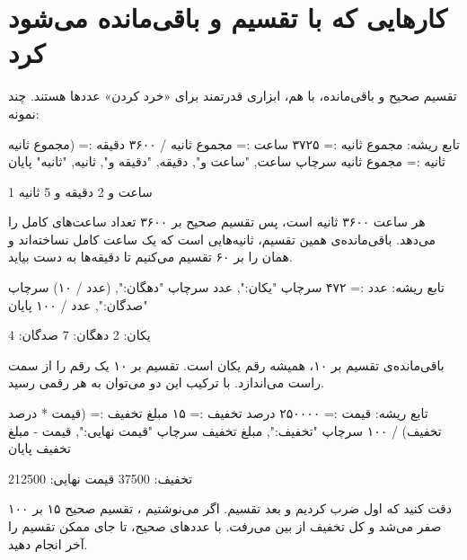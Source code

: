 \section{کارهایی که با تقسیم و باقی‌مانده می‌شود کرد}

تقسیم صحیح و باقی‌مانده، با هم، ابزاری قدرتمند برای «خرد کردن» عددها
هستند. چند نمونه:

\begin{salamfa}
تابع ریشه:
    مجموع ثانیه := ۳۷۲۵
    ساعت := مجموع ثانیه / ۳۶۰۰
    دقیقه := (مجموع ثانیه %
    ثانیه := مجموع ثانیه %
    سرچاپ ساعت, "ساعت و", دقیقه, "دقیقه و", ثانیه, "ثانیه"
پایان
\end{salamfa}

\begin{outputfa}
1 ساعت و 2 دقیقه و 5 ثانیه
\end{outputfa}

هر ساعت ۳۶۰۰ ثانیه است، پس تقسیم صحیح بر ۳۶۰۰ تعداد ساعت‌های کامل را
می‌دهد. باقی‌مانده‌ی همین تقسیم، ثانیه‌هایی است که یک ساعت کامل نساخته‌اند و
همان را بر ۶۰ تقسیم می‌کنیم تا دقیقه‌ها به دست بیاید.

\begin{salamfa}
تابع ریشه:
    عدد := ۴۷۲
    سرچاپ "یکان:", عدد %
    سرچاپ "دهگان:", (عدد / ۱۰) %
    سرچاپ "صدگان:", عدد / ۱۰۰
پایان
\end{salamfa}

\begin{outputfa}
یکان: 2
دهگان: 7
صدگان: 4
\end{outputfa}

باقی‌مانده‌ی تقسیم بر ۱۰، همیشه رقم یکان است. تقسیم بر ۱۰ یک رقم را از
سمت راست می‌اندازد. با ترکیب این دو می‌توان به هر رقمی رسید.

\begin{salamfa}
تابع ریشه:
    قیمت := ۲۵۰۰۰۰
    درصد تخفیف := ۱۵
    مبلغ تخفیف := (قیمت * درصد تخفیف) / ۱۰۰
    سرچاپ "تخفیف:", مبلغ تخفیف
    سرچاپ "قیمت نهایی:", قیمت - مبلغ تخفیف
پایان
\end{salamfa}

\begin{outputfa}
تخفیف: 37500
قیمت نهایی: 212500
\end{outputfa}

دقت کنید که اول ضرب کردیم و بعد تقسیم. اگر می‌نوشتیم
، تقسیم صحیح ۱۵ بر ۱۰۰ صفر می‌شد و کل
تخفیف از بین می‌رفت. با عددهای صحیح، تا جای ممکن تقسیم را آخر انجام دهید.

